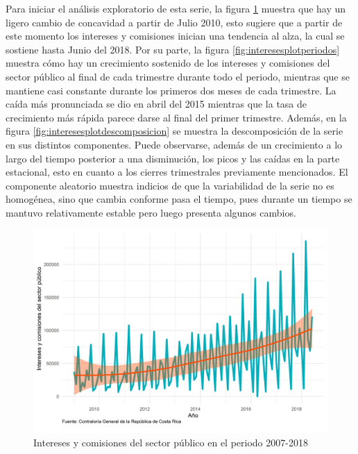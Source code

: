 \documentclass[
]{article}
\begin{document}
Para iniciar el análisis exploratorio de esta serie, la figura
\ref{fig:interesesplotgeneral} muestra que hay un ligero cambio de
concavidad a partir de Julio 2010, esto sugiere que a partir de este
momento los intereses y comisiones inician una tendencia al alza, la
cual se sostiene hasta Junio del 2018. Por su parte, la figura
\ref{fig:interesesplotperiodos} muestra cómo hay un crecimiento
sostenido de los intereses y comisiones del sector público al final de
cada trimestre durante todo el periodo, mientras que se mantiene casi
constante durante los primeros dos meses de cada trimestre. La caída más
pronunciada se dio en abril del 2015 mientras que la tasa de crecimiento
más rápida parece darse al final del primer trimestre. Además, en la
figura \ref{fig:interesesplotdescomposicion} se muestra la
descomposición de la serie en sus distintos componentes. Puede
observarse, además de un crecimiento a lo largo del tiempo posterior a
una disminución, los picos y las caídas en la parte estacional, esto en
cuanto a los cierres trimestrales previamente mencionados. El componente
aleatorio muestra indicios de que la variabilidad de la serie no es
homogénea, sino que cambia conforme pasa el tiempo, pues durante un
tiempo se mantuvo relativamente estable pero luego presenta algunos
cambios.

\begin{figure}[!h]
\includegraphics[width=1\linewidth,height=1\textheight]{Tesis_files/figure-latex/interesesplotgeneral-1} \caption{Intereses y comisiones del sector público en el periodo 2007-2018}\label{fig:interesesplotgeneral}
\end{figure}
\end{document}
